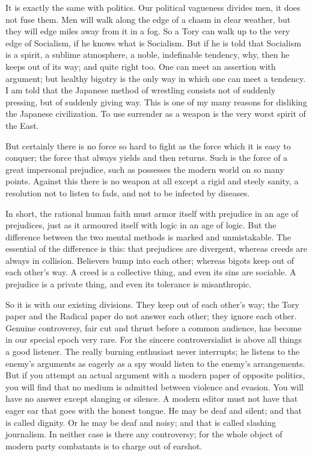 \documentclass[final,10pt,letterpaper,twocolumn,openany]{book}
\begin{document}
It is exactly the same with politics. Our political vagueness divides
men, it does not fuse them. Men will walk along the edge of a chasm in
clear weather, but they will edge miles away from it in a fog. So a Tory
can walk up to the very edge of Socialism, if he knows what is Socialism.
But if he is told that Socialism is a spirit, a sublime atmosphere, a noble,
indefinable tendency, why, then he keeps out of its way; and quite right
too. One can meet an assertion with argument; but healthy bigotry is the
only way in which one can meet a tendency. I am told that the Japanese
method of wrestling consists not of suddenly pressing, but of suddenly
giving way. This is one of my many reasons for disliking the Japanese
civilization. To use surrender as a weapon is the very worst spirit of the
East. 

But certainly there is no force so hard to fight as the force which it is
easy to conquer; the force that always yields and then returns. Such is the
force of a great impersonal prejudice, such as possesses the modern world
on so many points. Against this there is no weapon at all except a rigid and
steely sanity, a resolution not to listen to fads, and not to be infected by
diseases.

In short, the rational human faith must armor itself with prejudice in an
age of prejudices, just as it armoured itself with logic in an age of logic.
But the difference between the two mental methods is marked and
unmistakable. The essential of the difference is this: that prejudices are
divergent, whereas creeds are always in collision. Believers bump into
each other; whereas bigots keep out of each other's way. A creed is a
collective thing, and even its sins are sociable. A prejudice is a private
thing, and even its tolerance is misanthropic. 

So it is with our existing
divisions. They keep out of each other's way; the Tory paper and the
Radical paper do not answer each other; they ignore each other. Genuine
controversy, fair cut and thrust before a common audience, has become in
our special epoch very rare. For the sincere controversialist is above all
things a good listener. The really burning enthusiast never interrupts; he
listens to the enemy's arguments as eagerly as a spy would listen to the
enemy's arrangements. But if you attempt an actual argument with a
modern paper of opposite politics, you will find that no medium is
admitted between violence and evasion. You will have no answer except
slanging or silence. A modern editor must not have that eager ear that goes
with the honest tongue. He may be deaf and silent; and that is called
dignity. Or he may be deaf and noisy; and that is called slashing
journalism. In neither case is there any controversy; for the whole object
of modern party combatants is to charge out of earshot.
\end{document}
